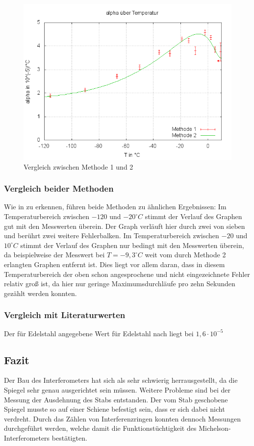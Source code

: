 \begin{figure}
\centering
        \includegraphics[width=.8\textwidth]{images/alpha(T)mitFit.png}
\caption{Vergleich zwischen Methode 1 und 2}
\label{alpha(T)mitFit}
\end{figure}


\subsubsection{Vergleich beider Methoden}
Wie in  zu erkennen, führen beide Methoden zu ähnlichen Ergebnissen: Im Temperaturbereich zwischen $ -120 $ und $ -20 ^{\circ} C $ stimmt der Verlauf des Graphen gut mit den Messwerten überein. Der Graph verläuft hier durch zwei von sieben und berührt zwei weitere Fehlerbalken. Im Temperaturbereich zwischen $ -20 $ und $ 10 ^{\circ} C $ stimmt der Verlauf des Graphen nur bedingt mit den Messwerten überein, da beispielweise der Messwert bei $T = -9,3 ^{\circ} C $ weit vom durch Methode 2 erlangten Graphen entfernt ist. Dies liegt vor allem daran, dass in diesem Temperaturbereich der oben schon angesprochene und nicht eingezeichnete Fehler relativ groß ist, da hier nur geringe Maximumsdurchläufe pro zehn Sekunden gezählt werden konnten.

\subsubsection{Vergleich mit Literaturwerten}
Der für Edelstahl angegebene Wert für Edelstahl nach \cite{edelstahl} liegt bei $ 1,6 \cdot 10^{-5} $


\subsection{Fazit}


Der Bau des Interferometers hat sich als sehr schwierig herrausgestellt, da die Spiegel sehr genau ausgerichtet sein müssen.
Weitere Probleme sind bei der Messung der Ausdehnung des Stabs entstanden. Der vom Stab geschobene Spiegel musste so auf einer Schiene befestigt sein, dass er sich dabei nicht verdreht.
Durch das Zählen von Interferenzringen konnten dennoch Messungen durchgeführt werden, welche damit die Funktionstüchtigkeit des Michelson-Interferometers bestätigten.


